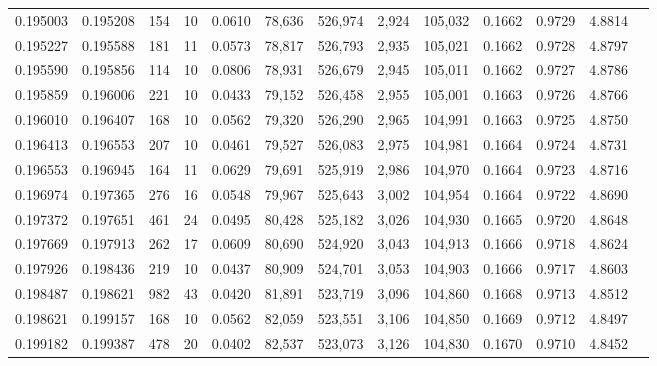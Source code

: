 \begin{tabular}{rrrrrrrrrrrrr}
0.195003 & 0.195208 &   154 &  10 &                                     0.0610 &  78,636 & 526,974 &   2,924 & 105,032 & 0.1662 & 0.9729 & 4.8814 \\
0.195227 & 0.195588 &   181 &  11 &                                     0.0573 &  78,817 & 526,793 &   2,935 & 105,021 & 0.1662 & 0.9728 & 4.8797 \\
0.195590 & 0.195856 &   114 &  10 &                                     0.0806 &  78,931 & 526,679 &   2,945 & 105,011 & 0.1662 & 0.9727 & 4.8786 \\
0.195859 & 0.196006 &   221 &  10 &                                     0.0433 &  79,152 & 526,458 &   2,955 & 105,001 & 0.1663 & 0.9726 & 4.8766 \\
0.196010 & 0.196407 &   168 &  10 &                                     0.0562 &  79,320 & 526,290 &   2,965 & 104,991 & 0.1663 & 0.9725 & 4.8750 \\
0.196413 & 0.196553 &   207 &  10 &                                     0.0461 &  79,527 & 526,083 &   2,975 & 104,981 & 0.1664 & 0.9724 & 4.8731 \\
0.196553 & 0.196945 &   164 &  11 &                                     0.0629 &  79,691 & 525,919 &   2,986 & 104,970 & 0.1664 & 0.9723 & 4.8716 \\
0.196974 & 0.197365 &   276 &  16 &                                     0.0548 &  79,967 & 525,643 &   3,002 & 104,954 & 0.1664 & 0.9722 & 4.8690 \\
0.197372 & 0.197651 &   461 &  24 &                                     0.0495 &  80,428 & 525,182 &   3,026 & 104,930 & 0.1665 & 0.9720 & 4.8648 \\
0.197669 & 0.197913 &   262 &  17 &                                     0.0609 &  80,690 & 524,920 &   3,043 & 104,913 & 0.1666 & 0.9718 & 4.8624 \\
0.197926 & 0.198436 &   219 &  10 &                                     0.0437 &  80,909 & 524,701 &   3,053 & 104,903 & 0.1666 & 0.9717 & 4.8603 \\
0.198487 & 0.198621 &   982 &  43 &                                     0.0420 &  81,891 & 523,719 &   3,096 & 104,860 & 0.1668 & 0.9713 & 4.8512 \\
0.198621 & 0.199157 &   168 &  10 &                                     0.0562 &  82,059 & 523,551 &   3,106 & 104,850 & 0.1669 & 0.9712 & 4.8497 \\
0.199182 & 0.199387 &   478 &  20 &                                     0.0402 &  82,537 & 523,073 &   3,126 & 104,830 & 0.1670 & 0.9710 & 4.8452 \\

\end{tabular}
